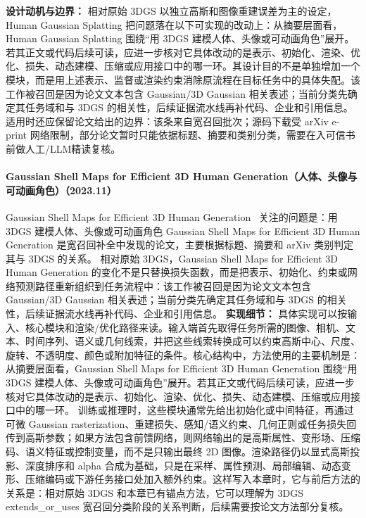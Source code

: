 \textbf{设计动机与边界：} 相对原始 3DGS 以独立高斯和图像重建误差为主的设定，Human Gaussian Splatting 把问题落在以下可实现的改动上：从摘要层面看，Human Gaussian Splatting 围绕“用 3DGS 建模人体、头像或可动画角色”展开。若其正文或代码后续可读，应进一步核对它具体改动的是表示、初始化、渲染、优化、损失、动态建模、压缩或应用接口中的哪一环。其设计目的不是单独增加一个模块，而是用上述表示、监督或渲染约束消除原流程在目标任务中的具体失配。该工作被召回是因为论文文本包含 Gaussian/3D Gaussian 相关表述；当前分类先确定其任务域和与 3DGS 的相关性，后续证据流水线再补代码、企业和引用信息。适用时还应保留论文给出的边界：该条来自宽召回批次；源码下载受 arXiv e-print 网络限制，部分论文暂时只能依据标题、摘要和类别分类，需要在入可信书前做人工/LLM精读复核。
\paragraph{Gaussian Shell Maps for Efficient 3D Human Generation（人体、头像与可动画角色）（2023.11）}
Gaussian Shell Maps for Efficient 3D Human Generation~\cite{2311_17857} 关注的问题是：用 3DGS 建模人体、头像或可动画角色 Gaussian Shell Maps for Efficient 3D Human Generation 是宽召回补全中发现的论文，主要根据标题、摘要和 arXiv 类别判定其与 3DGS 的关系。
相对原始 3DGS，Gaussian Shell Maps for Efficient 3D Human Generation 的变化不是只替换损失函数，而是把表示、初始化、约束或网络预测路径重新组织到任务流程中：该工作被召回是因为论文文本包含 Gaussian/3D Gaussian 相关表述；当前分类先确定其任务域和与 3DGS 的相关性，后续证据流水线再补代码、企业和引用信息。
\textbf{实现细节：} 具体实现可以按输入、核心模块和渲染/优化路径来读。输入端首先取得任务所需的图像、相机、文本、时间序列、语义或几何线索，并把这些线索转换成可以约束高斯中心、尺度、旋转、不透明度、颜色或附加特征的条件。核心结构中，方法使用的主要机制是：从摘要层面看，Gaussian Shell Maps for Efficient 3D Human Generation 围绕“用 3DGS 建模人体、头像或可动画角色”展开。若其正文或代码后续可读，应进一步核对它具体改动的是表示、初始化、渲染、优化、损失、动态建模、压缩或应用接口中的哪一环。 训练或推理时，这些模块通常先给出初始化或中间特征，再通过可微 Gaussian rasterization、重建损失、感知/语义约束、几何正则或任务损失回传到高斯参数；如果方法包含前馈网络，则网络输出的是高斯属性、变形场、压缩码、语义特征或控制变量，而不是只输出最终 2D 图像。渲染路径仍以显式高斯投影、深度排序和 alpha 合成为基础，只是在采样、属性预测、局部编辑、动态变形、压缩编码或下游任务接口处加入额外约束。这样写入本章时，它与前后方法的关系是：相对原始 3DGS 和本章已有锚点方法，它可以理解为 3DGS extends\_or\_uses 宽召回分类阶段的关系判断，后续需要按论文方法部分复核。
